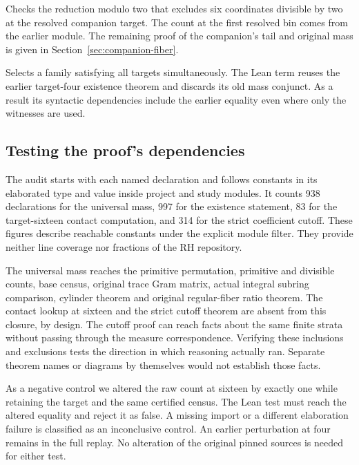 \documentclass[12pt,letterpaper]{article}
\newcommand{\code}[1]{\texttt{\detokenize{#1}}}
\begin{document}
\begin{description}[style=nextline]
\item[\code{RamDilate.Companion.no_companion_unit}] Checks the reduction modulo two that excludes six coordinates divisible by two at the resolved companion target. The count at the first resolved bin comes from the earlier module. The remaining proof of the companion's tail and original mass is given in Section~\ref{sec:companion-fiber}.
\item[\code{RamDilate.realized}] Selects a family satisfying all targets simultaneously. The Lean term reuses the earlier target-four existence theorem and discards its old mass conjunct. As a result its syntactic dependencies include the earlier equality even where only the witnesses are used.
\end{description}

\subsection{Testing the proof's dependencies}
The audit starts with each named declaration and follows constants in its elaborated type and value inside project and study modules. It counts 938 declarations for the universal mass, 997 for the existence statement, 83 for the target-sixteen contact computation, and 314 for the strict coefficient cutoff. These figures describe reachable constants under the explicit module filter. They provide neither line coverage nor fractions of the RH repository.

The universal mass reaches the primitive permutation, primitive and divisible counts, base census, original trace Gram matrix, actual integral subring comparison, cylinder theorem and original regular-fiber ratio theorem. The contact lookup at sixteen and the strict cutoff theorem are absent from this closure, by design. The cutoff proof can reach facts about the same finite strata without passing through the measure correspondence. Verifying these inclusions and exclusions tests the direction in which reasoning actually ran. Separate theorem names or diagrams by themselves would not establish those facts.

As a negative control we altered the raw count at sixteen by exactly one while retaining the target and the same certified census. The Lean test must reach the altered equality and reject it as false. A missing import or a different elaboration failure is classified as an inconclusive control. An earlier perturbation at four remains in the full replay. No alteration of the original pinned sources is needed for either test.
\end{document}
